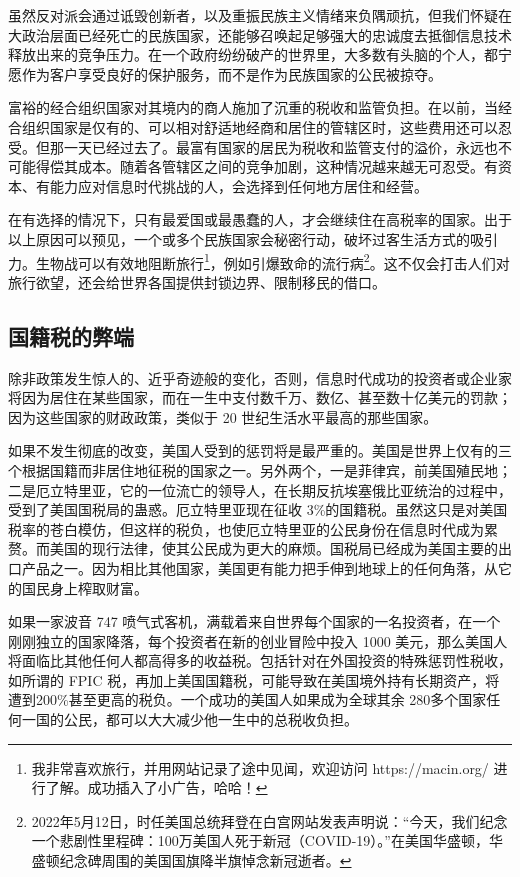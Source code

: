 虽然反对派会通过诋毁创新者，以及重振民族主义情绪来负隅顽抗，但我们怀疑在大政治层面已经死亡的民族国家，还能够召唤起足够强大的忠诚度去抵御信息技术释放出来的竞争压力。在一个政府纷纷破产的世界里，大多数有头脑的个人，都宁愿作为客户享受良好的保护服务，而不是作为民族国家的公民被掠夺。

富裕的经合组织国家对其境内的商人施加了沉重的税收和监管负担。在以前，当经合组织国家是仅有的、可以相对舒适地经商和居住的管辖区时，这些费用还可以忍受。但那一天已经过去了。最富有国家的居民为税收和监管支付的溢价，永远也不可能得偿其成本。随着各管辖区之间的竞争加剧，这种情况越来越无可忍受。有资本、有能力应对信息时代挑战的人，会选择到任何地方居住和经营。

在有选择的情况下，只有最爱国或最愚蠢的人，才会继续住在高税率的国家。出于以上原因可以预见，一个或多个民族国家会秘密行动，破坏过客生活方式的吸引力。生物战可以有效地阻断旅行\footnote{我非常喜欢旅行，并用网站记录了途中见闻，欢迎访问 https://macin.org/ 进行了解。成功插入了小广告，哈哈！}，例如引爆致命的流行病\footnote{2022年5月12日，时任美国总统拜登在白宫网站发表声明说：“今天，我们纪念一个悲剧性里程碑：100万美国人死于新冠（COVID-19）。”在美国华盛顿，华盛顿纪念碑周围的美国国旗降半旗悼念新冠逝者。}。这不仅会打击人们对旅行欲望，还会给世界各国提供封锁边界、限制移民的借口。

\subsection{国籍税的弊端}
除非政策发生惊人的、近乎奇迹般的变化，否则，信息时代成功的投资者或企业家将因为居住在某些国家，而在一生中支付数千万、数亿、甚至数十亿美元的罚款；因为这些国家的财政政策，类似于 20 世纪生活水平最高的那些国家。

如果不发生彻底的改变，美国人受到的惩罚将是最严重的。美国是世界上仅有的三个根据国籍而非居住地征税的国家之一。另外两个，一是菲律宾，前美国殖民地；二是厄立特里亚，它的一位流亡的领导人，在长期反抗埃塞俄比亚统治的过程中，受到了美国国税局的蛊惑。厄立特里亚现在征收 3\%的国籍税。虽然这只是对美国税率的苍白模仿，但这样的税负，也使厄立特里亚的公民身份在信息时代成为累赘。而美国的现行法律，使其公民成为更大的麻烦。国税局已经成为美国主要的出口产品之一。因为相比其他国家，美国更有能力把手伸到地球上的任何角落，从它的国民身上榨取财富。

如果一家波音 747 喷气式客机，满载着来自世界每个国家的一名投资者，在一个刚刚独立的国家降落，每个投资者在新的创业冒险中投入 1000 美元，那么美国人将面临比其他任何人都高得多的收益税。包括针对在外国投资的特殊惩罚性税收，如所谓的 FPIC 税，再加上美国国籍税，可能导致在美国境外持有长期资产，将遭到200\%甚至更高的税负。一个成功的美国人如果成为全球其余 280多个国家任何一国的公民，都可以大大减少他一生中的总税收负担。

